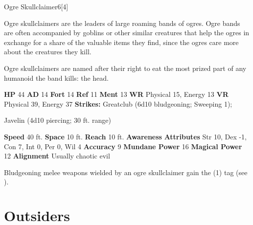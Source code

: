   \begin{monsubsection}{Ogre Skullclaimer}{6}[4]
    \vspace{-1em}\vspace{-1em}
    \vspace{0em}

    
          Ogre skullclaimers are the leaders of large roaming bands of ogres.
          Ogre bands are often accompanied by goblins or other similar creatures that help the ogres in exchange for a share of the valuable items they find, since the ogres care more about the creatures they kill.
        
          Ogre skullclaimers are named after their right to eat the most prized part of any humanoid the band kills: the head.
        

    \begin{spellcontent}
      \begin{spelltargetinginfo}
        \pari \textbf{HP} 44 \monsep
          \textbf{AD} 14 \monsep
          \textbf{Fort} 14 \monsep
          \textbf{Ref} 11 \monsep
          \textbf{Ment} 13
        \pari \textbf{WR} Physical 15, Energy 13 \monsep
        \textbf{VR} Physical 39, Energy 37
        \pari \textbf{Strikes:}
            Greatclub  (6d10 bludgeoning; Sweeping 1);
\par Javelin  (4d10 piercing; 30 ft. range)
      \end{spelltargetinginfo}
    \end{spellcontent}
    \begin{monsterfooter}
      \pari \textbf{Speed} 40 ft. \monsep
        \textbf{Space} 10 ft. \monsep
        \textbf{Reach} 10 ft.
      \pari \textbf{Awareness} 
      \pari \textbf{Attributes}
        Str 10, Dex -1,
        Con 7, Int 0,
        Per 0, Wil 4
      \pari \textbf{Accuracy} 9 \monsep
        \textbf{Mundane Power} 16 \monsep
      \textbf{Magical Power} 12
      \pari \textbf{Alignment} Usually chaotic evil
    \end{monsterfooter}
  \end{monsubsection}
            Bludgeoning melee weapons wielded by an ogre skullclaimer gain the  (1) tag (see ).
  
  
        \newpage
        \section{Outsiders}

